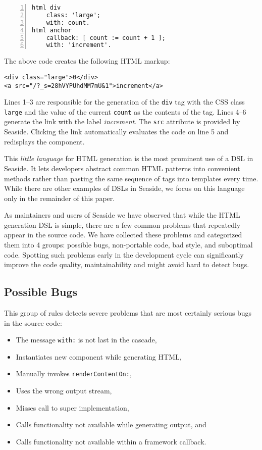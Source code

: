 \documentclass[10pt,twocolumn]{article}
\newcommand{\ct}{\lstinline[backgroundcolor=\color{white}]}
\newcommand{\Seaside}{Seaside\xspace}
\newenvironment{bullets}[0]
	{\begin{itemize}
		\setlength{\itemsep}{1pt}
		\setlength{\parskip}{0pt}
		\setlength{\parsep}{0pt}}
	{\end{itemize}}
\begin{document}
\begin{lstlisting}[numbers=left]
html div
	class: 'large';
	with: count.
html anchor
	callback: [ count := count + 1 ];
	with: 'increment'.
\end{lstlisting}

\noindent The above code creates the following HTML markup:

\begin{lstlisting}
<div class="large">0</div>
<a src="/?_s=28hVYPUhdMM7mU&1">increment</a>
\end{lstlisting}

Lines 1--3 are responsible for the generation of the \ct{div} tag with the CSS class \ct{large} and the value of the current \ct{count} as the contents of the tag. Lines 4--6 generate the link with the label \emph{increment}. The \ct{src} attribute is provided by \Seaside. Clicking the link automatically evaluates the code on line 5 and redisplays the component.

This \emph{little language} \cite{Deur97a} for HTML generation is the most prominent use of a DSL in \Seaside. It lets developers abstract common HTML patterns into convenient methods rather than pasting the same sequence of tags into templates every time. While there are other examples of DSLs in \Seaside, we focus on this language only in the remainder of this paper.

As maintainers and users of \Seaside we have observed that while the HTML generation DSL is simple, there are a few common problems that repeatedly appear in the source code. We have collected these problems and categorized them into 4 groups: possible bugs, non-portable code, bad style, and suboptimal code. Spotting such problems early in the development cycle can significantly improve the code quality, maintainability and might avoid hard to detect bugs.

\subsection{Possible Bugs}\label{sec:slime-possiblebugs}

This group of rules detects severe problems that are most certainly serious bugs in the source code:

\begin{bullets}
	\item The message \ct{with:} is not last in the cascade,
	\item Instantiates new component while generating HTML, 
	\item Manually invokes \ct{renderContentOn:},
	\item Uses the wrong output stream, 
	\item Misses call to super implementation,
	\item Calls functionality not available while generating output, and 
	\item Calls functionality not available within a framework callback.
\end{bullets}
\end{document}
